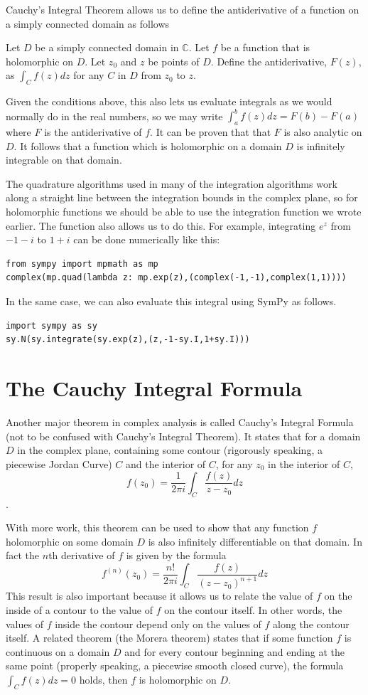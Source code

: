Cauchy's Integral Theorem allows us to define the antiderivative of a function on a simply connected domain as follows
\begin{theorem}
Let $D$ be a simply connected domain in $\mathbb{C}$. Let $f$ be a function that is holomorphic on $D$.
Let $z_0$ and $z$ be points of $D$. Define the antiderivative, $F(z)$, as $\int_C f(z)dz$ for any $C$ in $D$ from $z_0$ to $z$.
\end{theorem}
Given the conditions above, this also lets us evaluate integrals as we would normally do in the real numbers, so we may write $\int_a^b f(z)dz=F(b)-F(a)$ where $F$ is the antiderivative of $f$.
It can be proven that that $F$ is also analytic on $D$.
It follows that a function which is holomorphic on a domain $D$ is infinitely integrable on that domain.

The quadrature algorithms used in many of the integration algorithms work along a straight line between the integration bounds in the complex plane, so for holomorphic functions we should be able to use the integration function we wrote earlier.
The  function also allows us to do this.
For example, integrating $e^z$ from $-1-i$ to $1+i$ can be done numerically like this:
\begin{lstlisting}
from sympy import mpmath as mp
complex(mp.quad(lambda z: mp.exp(z),(complex(-1,-1),complex(1,1))))
\end{lstlisting}
In the same case, we can also evaluate this integral using SymPy as follows.
\begin{lstlisting}
import sympy as sy
sy.N(sy.integrate(sy.exp(z),(z,-1-sy.I,1+sy.I)))
\end{lstlisting}

\section*{The Cauchy Integral Formula}

Another major theorem in complex analysis is called Cauchy's Integral Formula (not to be confused with Cauchy's Integral Theorem).
It states that for a domain $D$ in the complex plane, containing some contour (rigorously speaking, a piecewise Jordan Curve) $C$ and the interior of $C$, for any $z_0$ in the interior of $C$, 
$$f(z_0)=\frac{1}{2\pi i} \int_C \frac{f(z)}{z-z_0} dz$$. 

With more work, this theorem can be used to show that any function $f$ holomorphic on some domain $D$ is also infinitely differentiable on that domain.
In fact the $n$th derivative of $f$ is given by the formula $$f^{(n)}(z_0) = \frac{n!}{2\pi i} \int_C \frac{f(z)}{(z-z_0)^{n+1}} dz$$
This result is also important because it allows us to relate the value of $f$ on the inside of a contour to the value of $f$ on the contour itself.
In other words, the values of $f$ inside the contour depend only on the values of $f$ along the contour itself.
A related theorem (the Morera theorem) states that if some function $f$ is continuous on a domain $D$ and for every contour beginning and ending at the same point (properly speaking, a piecewise smooth closed curve), the formula $\int_C f(z) dz = 0$ holds, then $f$ is holomorphic on $D$. 

